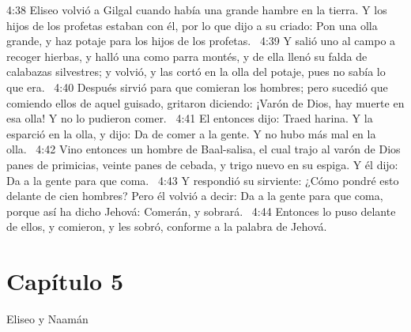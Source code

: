 4:38 Eliseo volvió a Gilgal cuando había una grande hambre en la tierra. Y los hijos de los profetas estaban con él, por lo que dijo a su criado: Pon una olla grande, y haz potaje para los hijos de los profetas.  
4:39 Y salió uno al campo a recoger hierbas, y halló una como parra montés, y de ella llenó su falda de calabazas silvestres; y volvió, y las cortó en la olla del potaje, pues no sabía lo que era.  
4:40 Después sirvió para que comieran los hombres; pero sucedió que comiendo ellos de aquel guisado, gritaron diciendo: ¡Varón de Dios, hay muerte en esa olla! Y no lo pudieron comer.  
4:41 El entonces dijo: Traed harina. Y la esparció en la olla, y dijo: Da de comer a la gente. Y no hubo más mal en la olla.  
4:42 Vino entonces un hombre de Baal-salisa, el cual trajo al varón de Dios panes de primicias, veinte panes de cebada, y trigo nuevo en su espiga. Y él dijo: Da a la gente para que coma.  
4:43 Y respondió su sirviente: ¿Cómo pondré esto delante de cien hombres? Pero él volvió a decir: Da a la gente para que coma, porque así ha dicho Jehová: Comerán, y sobrará.  
4:44 Entonces lo puso delante de ellos, y comieron, y les sobró, conforme a la palabra de Jehová.  
\section*{Capítulo 5}
Eliseo y Naamán  

